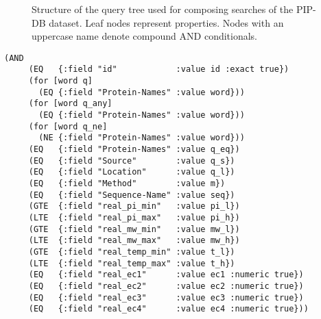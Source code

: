 \begin{figure}[t]
\centering
{}
\caption[Structure of the query tree for composing searches]
        {Structure of the query tree used for composing searches of
          the PIP-DB dataset. Leaf nodes represent properties. Nodes
          with an uppercase name denote compound AND conditionals.}
\label{fig:query-tree}
\end{figure}


\lstset{language=Lisp}
\begin{center}
\begin{lstlisting}[label=lst:query-tree,caption={
      [Clojure implementation of the query tree]
      Implementation of the query tree in Clojure, from the file
      \texttt{query.clj}. Note the flat query hierarchy and the
      use of the \texttt{for} macro for expanding multivalued
      queries.}]
    (AND
     (EQ   {:field "id"            :value id :exact true})
     (for [word q]
       (EQ {:field "Protein-Names" :value word}))
     (for [word q_any]
       (EQ {:field "Protein-Names" :value word}))
     (for [word q_ne]
       (NE {:field "Protein-Names" :value word}))
     (EQ   {:field "Protein-Names" :value q_eq})
     (EQ   {:field "Source"        :value q_s})
     (EQ   {:field "Location"      :value q_l})
     (EQ   {:field "Method"        :value m})
     (EQ   {:field "Sequence-Name" :value seq})
     (GTE  {:field "real_pi_min"   :value pi_l})
     (LTE  {:field "real_pi_max"   :value pi_h})
     (GTE  {:field "real_mw_min"   :value mw_l})
     (LTE  {:field "real_mw_max"   :value mw_h})
     (GTE  {:field "real_temp_min" :value t_l})
     (LTE  {:field "real_temp_max" :value t_h})
     (EQ   {:field "real_ec1"      :value ec1 :numeric true})
     (EQ   {:field "real_ec2"      :value ec2 :numeric true})
     (EQ   {:field "real_ec3"      :value ec3 :numeric true})
     (EQ   {:field "real_ec4"      :value ec4 :numeric true}))
\end{lstlisting}
\end{center}


